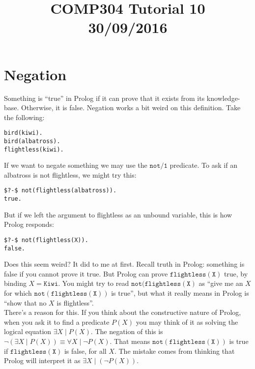 \documentclass[a4paper,12pt]{article}
\newcommand{\kwa}[1]{\mathtt{#1}}
\begin{document}
\title{COMP304 Tutorial 10 \\ 30/09/2016}
\date{}
\maketitle

\section{Negation}

\noindent
Something is ``true'' in Prolog if it can prove that it exists from its knowledge-base. Otherwise, it is false. Negation works a bit weird on this definition. Take the following:

\begin{lstlisting}
bird(kiwi).
bird(albatross).
flightless(kiwi).
\end{lstlisting}

\noindent
If we want to negate something we may use the $\kwa{not \slash 1}$ predicate. To ask if an albatross is not flightless, we might try this:

\begin{lstlisting}
$?-$ not(flightless(albatross)).
true.
\end{lstlisting}

\noindent
But if we left the argument to flightless as an unbound variable, this is how Prolog responds:

\begin{lstlisting}
$?-$ not(flightless(X)).
false.
\end{lstlisting}

\noindent
Does this seem weird? It did to me at first. Recall truth in Prolog: something is false if you cannot prove it true. But Prolog can prove $\kwa{flightless(X)}$ true, by binding $X = \kwa{Kiwi}$. You might try to read $\kwa{not(flightless(X)}$ as ``give me an $X$ for which $\kwa{not(flightless(X))}$ is true'', but what it really means in Prolog is ``show that no $X$ is flightless''. \\

\noindent
There's a reason for this. If you think about the constructive nature of Prolog, when you ask it to find a predicate $P(X)$ you may think of it as solving the logical equation $\exists X \mid P(X)$. The negation of this is $\neg (\exists X \mid P(X)) \equiv \forall X \mid \neg P(X)$. That means $\kwa{not(flightless(X))}$ is true if $\kwa{flightless(X)}$ is false, for all $X$. The mistake comes from thinking that Prolog will interpret it as $\exists X \mid (\neg P(X))$.\\
\end{document}
